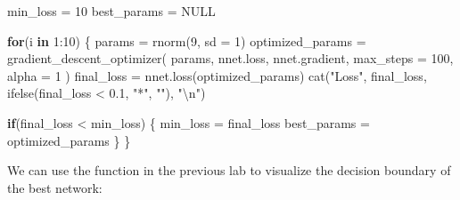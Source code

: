 \documentclass[
  a4paper,
]{article}
\newenvironment{Shaded}{\begin{snugshade}}{\end{snugshade}}
\newcommand{\AttributeTok}[1]{\textcolor[rgb]{0.77,0.63,0.00}{#1}}
\newcommand{\ConstantTok}[1]{\textcolor[rgb]{0.00,0.00,0.00}{#1}}
\newcommand{\ControlFlowTok}[1]{\textcolor[rgb]{0.13,0.29,0.53}{\textbf{#1}}}
\newcommand{\DecValTok}[1]{\textcolor[rgb]{0.00,0.00,0.81}{#1}}
\newcommand{\FloatTok}[1]{\textcolor[rgb]{0.00,0.00,0.81}{#1}}
\newcommand{\FunctionTok}[1]{\textcolor[rgb]{0.00,0.00,0.00}{#1}}
\newcommand{\NormalTok}[1]{#1}
\newcommand{\OtherTok}[1]{\textcolor[rgb]{0.56,0.35,0.01}{#1}}
\newcommand{\SpecialCharTok}[1]{\textcolor[rgb]{0.00,0.00,0.00}{#1}}
\newcommand{\StringTok}[1]{\textcolor[rgb]{0.31,0.60,0.02}{#1}}
\begin{document}
\begin{Shaded}
\begin{Highlighting}[]
\NormalTok{min\_loss }\OtherTok{=} \DecValTok{10}
\NormalTok{best\_params }\OtherTok{=} \ConstantTok{NULL}

\ControlFlowTok{for}\NormalTok{(i }\ControlFlowTok{in} \DecValTok{1}\SpecialCharTok{:}\DecValTok{10}\NormalTok{) \{}
\NormalTok{  params }\OtherTok{=} \FunctionTok{rnorm}\NormalTok{(}\DecValTok{9}\NormalTok{, }\AttributeTok{sd =} \DecValTok{1}\NormalTok{)}
\NormalTok{  optimized\_params }\OtherTok{=} \FunctionTok{gradient\_descent\_optimizer}\NormalTok{(}
\NormalTok{    params, nnet.loss, nnet.gradient, }\AttributeTok{max\_steps =} \DecValTok{100}\NormalTok{, }\AttributeTok{alpha =} \DecValTok{1}
\NormalTok{  )}
\NormalTok{  final\_loss }\OtherTok{=} \FunctionTok{nnet.loss}\NormalTok{(optimized\_params)}
  \FunctionTok{cat}\NormalTok{(}\StringTok{"Loss"}\NormalTok{, final\_loss, }\FunctionTok{ifelse}\NormalTok{(final\_loss }\SpecialCharTok{\textless{}} \FloatTok{0.1}\NormalTok{, }\StringTok{"*"}\NormalTok{, }\StringTok{""}\NormalTok{), }\StringTok{"}\SpecialCharTok{\textbackslash{}n}\StringTok{"}\NormalTok{)}
  
  \ControlFlowTok{if}\NormalTok{(final\_loss }\SpecialCharTok{\textless{}}\NormalTok{ min\_loss) \{}
\NormalTok{    min\_loss }\OtherTok{=}\NormalTok{ final\_loss}
\NormalTok{    best\_params }\OtherTok{=}\NormalTok{ optimized\_params}
\NormalTok{  \}}
\NormalTok{\}}
\end{Highlighting}
\end{Shaded}

We can use the function in the previous lab to visualize the decision
boundary of the best network:
\end{document}
